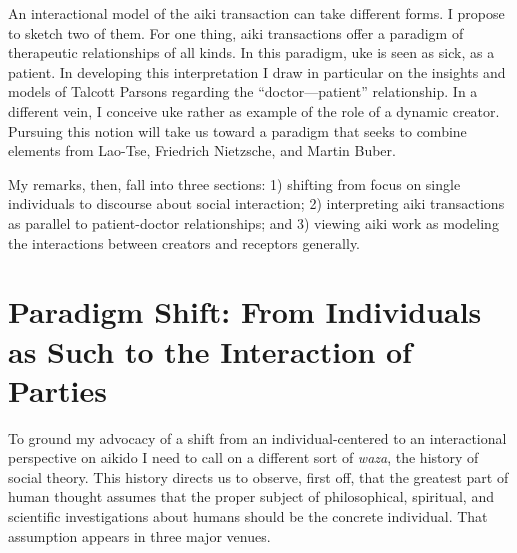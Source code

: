 An interactional model of the aiki transaction can take different forms. I propose to sketch two of them. For one thing, aiki transactions offer a paradigm of therapeutic relationships of all kinds. In this paradigm, uke is seen as sick, as a patient. In developing this interpretation I draw in particular on the insights and models of Talcott Parsons regarding the ``doctor---patient'' relationship. In a different vein, I conceive uke rather as example of the role of a dynamic creator. Pursuing this notion will take us toward a paradigm that seeks to combine elements from Lao-Tse, Friedrich Nietzsche, and Martin Buber.

My remarks, then, fall into three sections: 1) shifting from focus on single individuals to discourse about social interaction; 2) interpreting aiki transactions as parallel to patient-doctor relationships; and 3) viewing aiki work as modeling the interactions between creators and receptors generally. 

\section*{Paradigm Shift: From Individuals as Such to the Interaction of Parties}

To ground my advocacy of a shift from an individual-centered to an interactional perspective on aikido I need to call on a different sort of \emph{waza}, the history of social theory. This history directs us to observe, first off, that the greatest part of human thought assumes that the proper subject of philosophical, spiritual, and scientific investigations about humans should be the concrete individual. That assumption appears in three major venues. 

